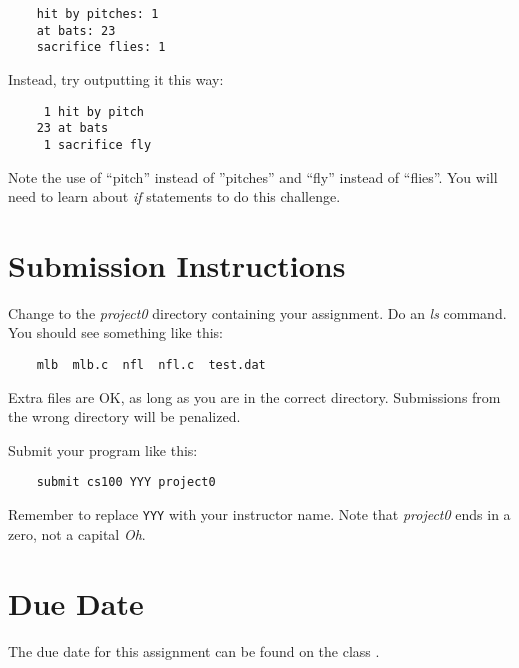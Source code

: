 \documentclass[12pt]{article}
\begin{document}
\begin{verbatim}
    hit by pitches: 1
    at bats: 23
    sacrifice flies: 1
\end{verbatim}

Instead, try outputting it this way:

\begin{verbatim}
     1 hit by pitch
    23 at bats
     1 sacrifice fly
\end{verbatim}

Note the use of ``pitch'' instead of ''pitches'' and 
``fly'' instead of ``flies''.
You will need to learn about {\it if} statements to do this challenge.

\section*{Submission Instructions}

Change to the {\it project0} directory containing your assignment.  Do an
{\it ls} command. You should see something like this:

\begin{verbatim}
    mlb  mlb.c  nfl  nfl.c  test.dat
\end{verbatim}

Extra files are OK, as long as you are in the correct directory. 
Submissions from the wrong directory
will be penalized.

Submit your program like this:

\begin{verbatim}
    submit cs100 YYY project0
\end{verbatim}

Remember to replace \verb!YYY! with your instructor name.
Note that {\it project0} ends in a zero, not a capital {\it Oh}.

\section*{Due Date}

The due date for this assignment can be found on the class
.
\end{document}
